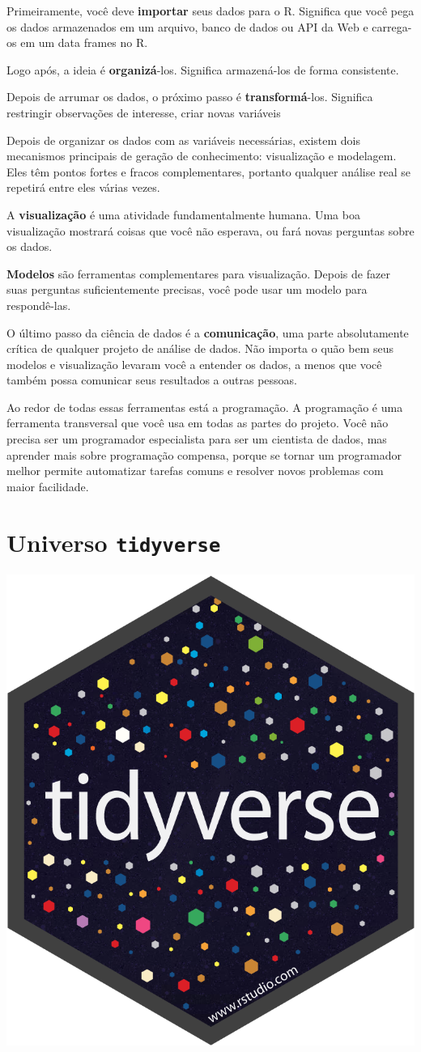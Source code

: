 \documentclass[]{book}
\begin{document}
Primeiramente, você deve \textbf{importar} seus dados para o R. Significa que você pega os dados armazenados em um arquivo, banco de dados ou API da Web e carrega-os em um data frames no R.

Logo após, a ideia é \textbf{organizá}-los. Significa armazená-los de forma consistente.

Depois de arrumar os dados, o próximo passo é \textbf{transformá}-los. Significa restringir observações de interesse, criar novas variáveis

Depois de organizar os dados com as variáveis necessárias, existem dois mecanismos principais de geração de conhecimento: visualização e modelagem. Eles têm pontos fortes e fracos complementares, portanto qualquer análise real se repetirá entre eles várias vezes.

A \textbf{visualização} é uma atividade fundamentalmente humana. Uma boa visualização mostrará coisas que você não esperava, ou fará novas perguntas sobre os dados.

\textbf{Modelos} são ferramentas complementares para visualização. Depois de fazer suas perguntas suficientemente precisas, você pode usar um modelo para respondê-las.

O último passo da ciência de dados é a \textbf{comunicação}, uma parte absolutamente crítica de qualquer projeto de análise de dados. Não importa o quão bem seus modelos e visualização levaram você a entender os dados, a menos que você também possa comunicar seus resultados a outras pessoas.

Ao redor de todas essas ferramentas está a programação. A programação é uma ferramenta transversal que você usa em todas as partes do projeto. Você não precisa ser um programador especialista para ser um cientista de dados, mas aprender mais sobre programação compensa, porque se tornar um programador melhor permite automatizar tarefas comuns e resolver novos problemas com maior facilidade.

\hypertarget{universo-tidyverse}{%
\section{\texorpdfstring{Universo \texttt{tidyverse}}{Universo tidyverse}}\label{universo-tidyverse}}

\begin{center}\includegraphics[width=0.25\linewidth]{imagens/hex-tidyverse} \end{center}
\end{document}
